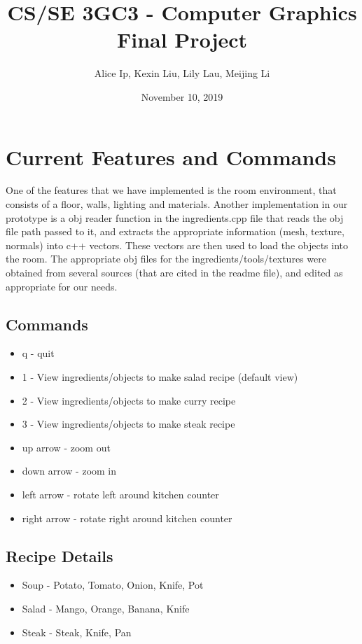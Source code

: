 \documentclass[11pt]{article}
\author{Alice Ip, Kexin Liu, Lily Lau, Meijing Li}
\date{November 10, 2019}
\title{CS/SE 3GC3 - Computer Graphics Final Project}
\begin{document}
\maketitle

\section*{Current Features and Commands}
\label{sec:orgea3dfb7}
One of the features that we have implemented is the room environment, that consists of a floor, walls, lighting and materials. Another implementation in our prototype is a obj reader function in the ingredients.cpp file that reads the obj file path passed to it, and extracts the appropriate information (mesh, texture, normals) into c++ vectors. These vectors are then used to load the objects into the room. The appropriate obj files for the ingredients/tools/textures were obtained from several sources (that are cited in the readme file), and edited as appropriate for our needs. 

\subsection*{Commands}
\label{sec:org30351a3}
\begin{itemize}
\item q - quit
\item 1 - View ingredients/objects to make salad recipe (default view)
\item 2 - View ingredients/objects to make curry recipe
\item 3 - View ingredients/objects to make steak recipe
\item up arrow - zoom out
\item down arrow - zoom in
\item left arrow - rotate left around kitchen counter
\item right arrow - rotate right around kitchen counter
\end{itemize}

\subsection*{Recipe Details}
\label{sec:org609a961}
\begin{itemize}
\item Soup - Potato, Tomato, Onion, Knife, Pot
\item Salad - Mango, Orange, Banana, Knife
\item Steak - Steak, Knife, Pan
\end{itemize}
\end{document}
